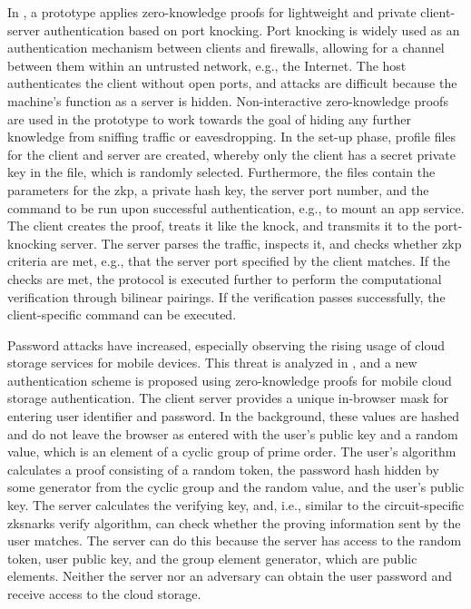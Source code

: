 In \citet{Major}, a prototype applies zero-knowledge proofs for lightweight and private client-server authentication based on port knocking. Port knocking is widely used as an authentication mechanism between clients and firewalls, allowing for a channel between them within an untrusted network, e.g., the Internet. The host authenticates the client without open ports, and attacks are difficult because the machine's function as a server is hidden. Non-interactive zero-knowledge proofs are used in the prototype to work towards the goal of hiding any further knowledge from sniffing traffic or eavesdropping. In the set-up phase, profile files for the client and server are created, whereby only the client has a secret private key in the file, which is randomly selected.
Furthermore, the files contain the parameters for the \acrshort{zkp}, a private hash key, the server port number, and the command to be run upon successful authentication, e.g., to mount an app service. The client creates the proof, treats it like the knock, and transmits it to the port-knocking server. The server parses the traffic, inspects it, and checks whether \acrshort{zkp} criteria are met, e.g., that the server port specified by the client matches. If the checks are met, the protocol is executed further to perform the computational verification through bilinear pairings. If the verification passes successfully, the client-specific command can be executed.

Password attacks have increased, especially observing the rising usage of cloud storage services for mobile devices. This threat is analyzed in \citet{Munivel}, and a new authentication scheme is proposed using zero-knowledge proofs for mobile cloud storage authentication. The client server provides a unique in-browser mask for entering user identifier and password. In the background, these values are hashed and do not leave the browser as entered with the user's public key and a random value, which is an element of a cyclic group of prime order. The user's algorithm calculates a proof consisting of a random token, the password hash hidden by some generator from the cyclic group and the random value, and the user's public key. The server calculates the verifying key, and, i.e., similar to the circuit-specific \acrshort{zksnark}s verify algorithm, can check whether the proving information sent by the user matches. The server can do this because the server has access to the random token, user public key, and the group element generator, which are public elements. Neither the server nor an adversary can obtain the user password and receive access to the cloud storage.

